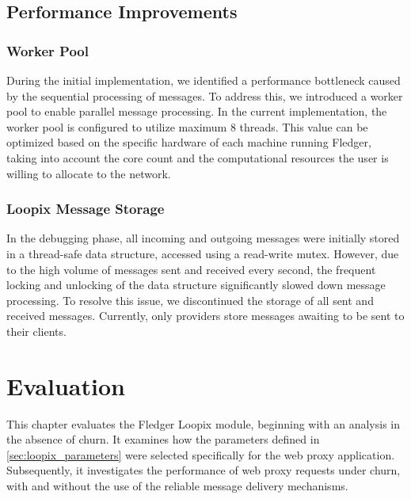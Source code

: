 \documentclass[a4paper,11pt,oneside]{report}
\begin{document}
\section{Performance Improvements}
\label{sec:performance}
\subsection{Worker Pool}
During the initial implementation, we identified a performance bottleneck caused by the sequential processing of messages. To address this, we introduced a worker pool to enable parallel message processing. In the current implementation, the worker pool is configured to utilize maximum 8 threads. This value can be optimized based on the specific hardware of each machine running Fledger, taking into account the core count and the computational resources the user is willing to allocate to the network.

\subsection{Loopix Message Storage}
In the debugging phase, all incoming and outgoing messages were initially stored in a thread-safe data structure, accessed using a read-write mutex. However, due to the high volume of messages sent and received every second, the frequent locking and unlocking of the data structure significantly slowed down message processing. To resolve this issue, we discontinued the storage of all sent and received messages. Currently, only providers store messages awaiting to be sent to their clients.

\chapter{Evaluation}
\label{sec:eval}


This chapter evaluates the Fledger Loopix module, beginning with an analysis in the absence of churn. It examines how the parameters defined in \autoref{sec:loopix_parameters} were selected specifically for the web proxy application. Subsequently, it investigates the performance of web proxy requests under churn, with and without the use of the reliable message delivery mechanisms.
\end{document}
